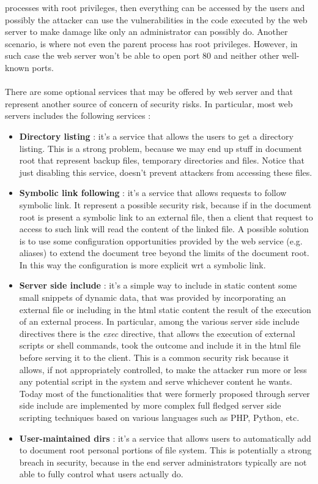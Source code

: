 processes with root privileges, then everything can be accessed by the users and possibly the attacker can use the vulnerabilities in the code executed by the web server to make damage like only an administrator can possibly do. Another scenario, is where not even the parent process has root privileges. However, in such case the web server won't be able to open port $80$ and neither other well-known ports.\\\\There are some optional services that may be offered by web server and that represent another source of concern of security risks. In particular, most web servers includes the following services :
\begin{itemize}
\item \textbf{Directory listing} : it's a service that allows the users to get a directory listing. This is a strong problem, because we may end up stuff in document root that represent backup files, temporary directories and files. Notice that just disabling this service, doesn't prevent attackers from accessing these files.
\item \textbf{Symbolic link following} : it's a service that allows requests to follow symbolic link. It represent a possible security risk, because if in the document root is present a symbolic link to an external file, then a client that request to access to such link will read the content of the linked file. A possible solution is to use some configuration opportunities provided by the web service (e.g. aliases) to extend the document tree beyond the limits of the document root. In this way the configuration is more explicit wrt a symbolic link.
\item \textbf{Server side include} : it's a simple way to include in static content some small snippets of dynamic data, that was provided by incorporating an external file or including in the html static content the result of the execution of an external process. In particular, among the various server side include directives there is the \textit{exec} directive, that allows the execution of external scripts or shell commands, took the outcome and include it in the html file before serving it to the client. This is a common security risk because it allows, if not appropriately controlled, to make the attacker run more or less any potential script in the system and serve whichever content he wants. Today most of the functionalities that were formerly proposed through server side include are implemented by more complex full fledged server side scripting techniques based on various languages such as PHP, Python, etc.
\item \textbf{User-maintained dirs} : it's a service that allows users to automatically add to document root personal portions of file system. This is potentially a strong breach in security, because in the end server administrators typically are not able to fully control what users actually do.
\end{itemize}
